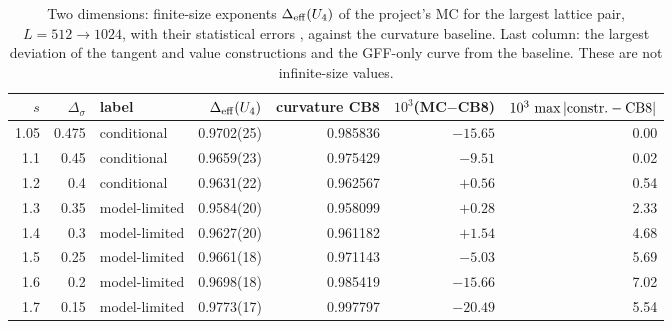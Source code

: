 \documentclass[11pt,a4paper]{article}
\numberwithin{equation}{section}
\newcommand{\Ds}{\Delta_\sigma}
\begin{document}
\begin{table}[htbp]\centering\small
\begin{tabular}{@{}r r l r r r r@{}}
\toprule
$s$ & $\Ds$ & label & $\Delta_{\rm eff}(U_4)$ & curvature CB8 & $10^3$(MC$-$CB8) & $10^3\,\max|{\rm constr.}-{\rm CB8}|$\\ \midrule
1.05 & 0.475 & conditional & 0.9702(25) & 0.985836 & $-15.65$ & 0.00\\
1.1 & 0.45 & conditional & 0.9659(23) & 0.975429 & $-9.51$ & 0.02\\
1.2 & 0.4 & conditional & 0.9631(22) & 0.962567 & $+0.56$ & 0.54\\
1.3 & 0.35 & model-limited & 0.9584(20) & 0.958099 & $+0.28$ & 2.33\\
1.4 & 0.3 & model-limited & 0.9627(20) & 0.961182 & $+1.54$ & 4.68\\
1.5 & 0.25 & model-limited & 0.9661(18) & 0.971143 & $-5.03$ & 5.69\\
1.6 & 0.2 & model-limited & 0.9698(18) & 0.985419 & $-15.66$ & 7.02\\
1.7 & 0.15 & model-limited & 0.9773(17) & 0.997797 & $-20.49$ & 5.54\\
\bottomrule
\end{tabular}
\caption{Two dimensions: finite-size exponents $\Delta_{\rm eff}(U_4)$ of the project's MC for
the largest lattice pair, $L=512\to1024$, with their statistical errors \cite{noteMC}, against
the curvature baseline. Last column: the largest deviation of the tangent and value
constructions and the GFF-only curve from the baseline. These are not infinite-size values.}
\label{tab:mc2d}
\end{table}
\end{document}
